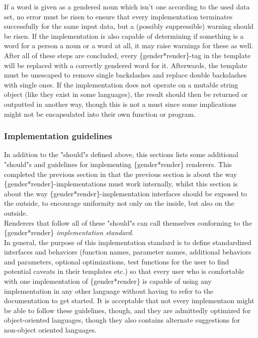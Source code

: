 \documentclass{article}
\begin{document}
    If a word is given as a gendered noun which isn't one according to the used data set, no error must be risen to ensure that every implementation terminates successfully for the same input data, but a (possibly suppressible) warning should be risen.
    If the implementation is also capable of determining if something is a word for a person a noun or a word at all, it may raise warnings for these as well.\\

    After all of these steps are concluded, every \{gender*render\}-tag in the template will be replaced with a correctly gendered word for it.
    Afterwards, the template must be unescaped to remove single backslashes and replace double backslashes with single ones.
    If the implementation does not operate on a mutable string object (like they exist in some languages), the result should then be returned or outputted in another way, though this is not a must since some implications might not be encapsulated into their own function or program.\\

    \subsubsection{Implementation guidelines}

    In addition  to the "should"s defined above, this sections lists some additional "should"s and guidelines for implementing \{gender*render\} renderers.
    This completed the previous section in that the previous section is about the way \{gender*render\}-implementations must work internally, whilst this section is about the way \{gender*render\}-implementation interfaces should be exposed to the outside, to encourage uniformity not only on the inside, but also on the outside.\\
    Renderers that follow all of these "should"s can call themselves conforming to the \{gender*render\} \emph{implementation standard}.\\

    In general, the purpose of this implementation standard is to define standardized interfaces and behaviors (function names, parameter names, additional behaviors and parameters, optional optimizations, test functions for the user to find potential caveats in their templates etc.) so that every user who is comfortable with one implementation of \{gender*render\} is capable of using any implementation in any other language without having to refer to the documentation to get started.
    It is acceptable that not every implementaon might be able to follow these guidelines, though, and they are admittedly optimized for object-oriented languages, though they also contains alternate suggestions for non-object oriented languages.\\
\end{document}
